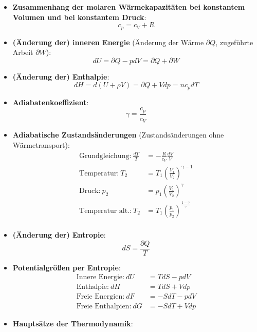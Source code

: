 \begin{itemize}
	\item \textbf{Zusammenhang der molaren Wärmekapazitäten bei konstantem Volumen und bei konstantem Druck}:
	\begin{equation}
		c_p = c_V + R
	\end{equation}
	\item \textbf{(Änderung der) inneren Energie} (Änderung der Wärme $\partial Q$, zugeführte Arbeit $\partial W$):
	\begin{equation}
		dU = \partial Q - pdV = \partial Q + \partial W
	\end{equation}
	\item \textbf{(Änderung der) Enthalpie}:
	\begin{equation}
		dH = d(U + \rho V) = \partial Q + Vdp = nc_pdT
	\end{equation}
	\item \textbf{Adiabatenkoeffizient}:
	\begin{equation}
		\gamma = \frac{c_p}{c_V}
	\end{equation}
	\item \textbf{Adiabatische Zustandsänderungen} (Zustandsänderungen ohne Wärmetransport):
	\begin{align*}
		\text{Grundgleichung:}\ \frac{dT}{T} &= -\frac{R}{c_V}\frac{dV}{V}\\
		\text{Temperatur:}\ T_2 &= T_1(\frac{V_1}{V_2})^{\gamma - 1}\\
		\text{Druck:}\ p_2 &= p_1(\frac{V_1}{V_2})^{\gamma}\\
		\text{Temperatur alt.:}\ T_2 &= T_1(\frac{p_1}{p_2})^{\frac{1 - \gamma}{\gamma}}\\
	\end{align*}
	\item \textbf{(Änderung der) Entropie}:
	\begin{equation}
		dS = \frac{\partial Q}{T}
	\end{equation}
	\item \textbf{Potentialgrößen per Entropie}:
	\begin{align*}
		\text{Innere Energie:}\ dU &= TdS - pdV\\
		\text{Enthalpie:}\ dH &= TdS + Vdp\\
		\text{Freie Energien:}\ dF &= -SdT - pdV\\
		\text{Freie Enthalpien:}\ dG &= -SdT + Vdp
	\end{align*}
	\item \textbf{Hauptsätze der Thermodynamik}:
	\begin{enumerate}
		\setcounter{enumi}{-1}

\end{enumerate}
\end{itemize}
